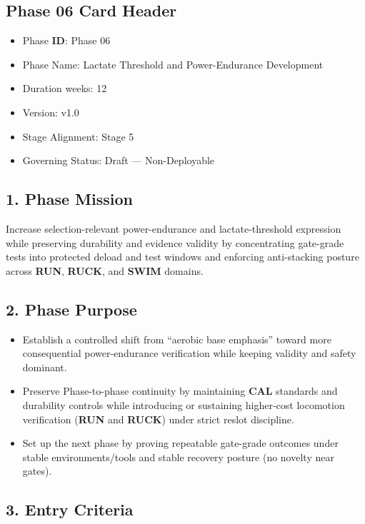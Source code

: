 \documentclass[10pt]{article}
\begin{document}
\subsection*{Phase 06 Card Header}
{}

\begin{itemize}
\item Phase \textbf{ID}: Phase 06
\item Phase Name: Lactate Threshold and Power-Endurance Development
\item Duration weeks: 12
\item Version: v1.0
\item Stage Alignment: Stage 5
\item Governing Status: Draft — Non-Deployable
\end{itemize}

\subsection*{1. Phase Mission}

Increase selection-relevant power-endurance and lactate-threshold expression while preserving durability and evidence validity by concentrating gate-grade tests into protected deload and test windows and enforcing anti-stacking posture across \textbf{RUN}, \textbf{RUCK}, and \textbf{SWIM} domains.

\subsection*{2. Phase Purpose}

\begin{itemize}
\item Establish a controlled shift from “aerobic base emphasis” toward more consequential power-endurance verification while keeping validity and safety dominant.
\item Preserve Phase-to-phase continuity by maintaining \textbf{CAL} standards and durability controls while introducing or sustaining higher-cost locomotion verification (\textbf{RUN} and \textbf{RUCK}) under strict reslot discipline.
\item Set up the next phase by proving repeatable gate-grade outcomes under stable environments/tools and stable recovery posture (no novelty near gates).
\end{itemize}

\subsection*{3. Entry Criteria}
\end{document}
